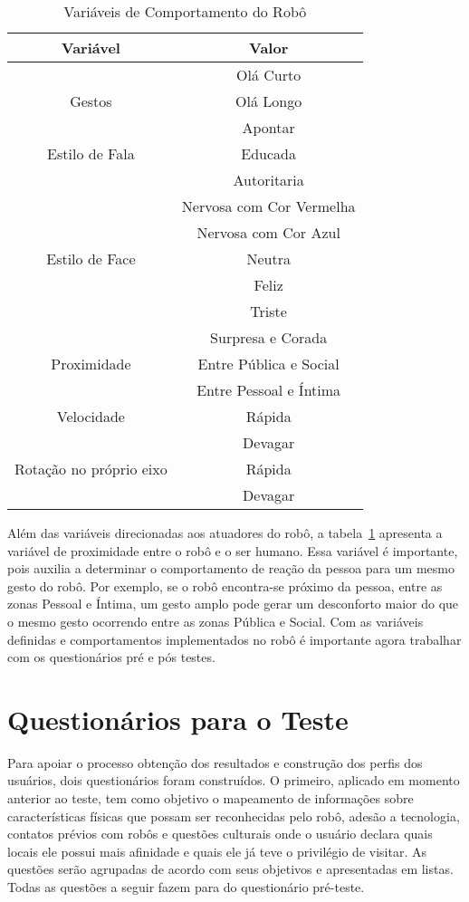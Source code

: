 \begin{table}[!ht]
	\caption{Variáveis de Comportamento do Robô}
	\label{tab:variaveisvalores}
	\centering
	\begin{tabular}{c | c}
		\hline
		Variável & Valor \\
		\hline
		& Olá Curto \\
		Gestos & Olá Longo \\
		& Apontar \\
		\hline
		Estilo de Fala & Educada \\
		& Autoritaria \\
		\hline
		& Nervosa com Cor Vermelha \\
		& Nervosa com Cor Azul \\
		Estilo de Face & Neutra \\
		& Feliz \\
		& Triste \\
		& Surpresa e Corada \\
		\hline
		Proximidade & Entre Pública e Social \\
		& Entre Pessoal e Íntima \\
		\hline
		Velocidade & Rápida \\
		& Devagar \\
		\hline
		Rotação no próprio eixo & Rápida \\
		& Devagar \\
		\hline
	\end{tabular}
\end{table}

Além das variáveis direcionadas aos atuadores do robô, a tabela~\ref{tab:variaveisvalores} apresenta a variável de proximidade entre o robô e o ser humano. Essa variável é importante, pois auxilia a determinar o comportamento de reação da pessoa para um mesmo gesto do robô. Por exemplo, se o robô encontra-se próximo da pessoa, entre as zonas Pessoal e Íntima, um gesto amplo pode gerar um desconforto maior do que o mesmo gesto ocorrendo entre as zonas Pública e Social. Com as variáveis definidas e comportamentos implementados no robô é importante agora trabalhar com os questionários pré e pós testes.

\section{Questionários para o Teste}
\label{sec:questionarios}
Para apoiar o processo obtenção dos resultados e construção dos perfis dos usuários, dois questionários foram construídos. O primeiro, aplicado em momento anterior ao teste, tem como objetivo o mapeamento de informações sobre características físicas que possam ser reconhecidas pelo robô, adesão a tecnologia, contatos prévios com robôs e questões culturais onde o usuário declara quais locais ele possui mais afinidade e quais ele já teve o privilégio de visitar. As questões serão agrupadas de acordo com seus objetivos e apresentadas em listas. Todas as questões a seguir fazem para do questionário pré-teste.

